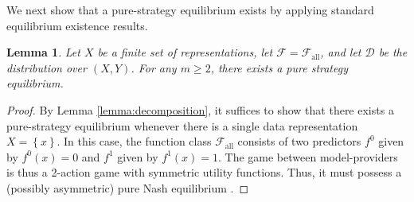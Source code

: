 \documentclass[letterpaper,11pt]{article}
\newtheorem{lemma}{Lemma}
\theoremstyle{plain}
\begin{document}
We next show that a pure-strategy equilibrium exists by applying standard equilibrium existence results. 
\begin{lemma}
\label{lemma:existence}
Let $X$ be a finite set of representations, let $\mathcal{F} = \mathcal{F}_{\text{all}}$, and let $\mathcal{D}$ be the distribution over $(X,Y)$. For any $m \ge 2$, there exists a pure strategy equilibrium. 
\end{lemma}
\begin{proof}
By Lemma \ref{lemma:decomposition}, it suffices to show that there exists a pure-strategy equilibrium whenever there is a single data representation $X = \left\{x\right\}$. In this case, the function class $\mathcal{F}_{\text{all}}$ consists of two predictors $f^0$ given by $f^0(x) = 0$ and $f^1$ given by $f^1(x) = 1$. The game between model-providers is thus a 2-action game with symmetric utility functions. Thus, it must possess a (possibly asymmetric) pure Nash equilibrium \citep{C04}. 
\end{proof}
\end{document}
